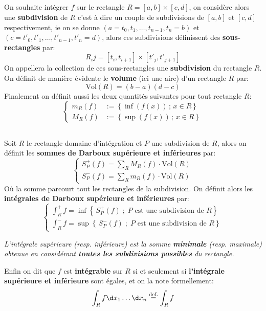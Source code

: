 \subsection*{}
On souhaite intégrer \(f\) sur le rectangle \(R = [a, b] \times [c, d]\), on considère alors une \textbf{subdivision} de \(R\) c'est à dire un couple de subdivisions de \([a, b] \text{ et } [c, d]\) respectivement, ie on se donne \((a = t_0, t_1, \ldots, t_{n-1}, t_n = b)\) et \((c = t'_0, t'_1, \ldots, t'_{n-1}, t'_n = d)\), alors ces subdivisions définissent des \textbf{sous-rectangles} par:
\[
   R_ij = [t_i, t_{i+1}] \times [t'_j, t'_{j+1}]   
\]
On appellera la collection de ces sous-rectangles une \textbf{subdivision} du rectangle \(R\). On définit de manière évidente le \textbf{volume} (ici une aire) d'un rectangle \(R\) par:
\[
   \text{Vol}(R) = (b - a)(d - c) 
\]
Finalement on définit aussi les deux quantités suivantes pour tout rectangle \(R\):
\[
   \begin{cases}
      m_R(f) &:= \left\{ \inf(f(x)) \, ; \, x \in R \right\}\\
      M_R(f) &:= \left\{ \sup(f(x)) \, ; \, x \in R \right\}
   \end{cases}   
\]
\pagebreak
\subsection*{}
Soit \(R\) le rectangle domaine d'intégration et \(P\) une subdivision de \(R\), alors on définit les \textbf{sommes de Darboux supérieure et inférieures} par:
\[
   \begin{cases}
      S_P^+(f) = \sum_R M_R(f) \cdot \text{Vol}(R)\\
      S_P^-(f) = \sum_R m_R(f) \cdot \text{Vol}(R) 
   \end{cases}
\] 
Où la somme parcourt tout les rectangles de la subdivision. On définit alors les \textbf{intégrales de Darboux supérieure et inférieures} par:
\[
   \begin{cases}
      \displaystyle\int_R^+{f} = \inf\left\{\, S_P^+(f)\; ; \; P \text{ est une subdivision de } R\right\}\\
      \displaystyle\int_R^-{f} = \sup\left\{\, S_P^-(f)\; ; \; P \text{ est une subdivision de } R\right\}
   \end{cases}
\]
\begin{center}
   \textit{
      L'intégrale supérieure (resp. inférieure) est la somme \textbf{minimale} (resp. maximale) obtenue en considérant \textbf{toutes les subdivisions possibles} du rectangle.
   }
\end{center}
Enfin on dit que \(f\) est \textbf{intégrable} sur \(R\) si et seulement si \textbf{l'intégrale supérieure et inférieure} sont égales, et on la note formellement:
\[
   \int_R f \d x_1 \ldots \d x_n \overset{\text{def.}}{=} \int_R f 
\]


